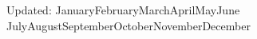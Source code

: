 \documentclass[11pt]{article}
\def\today{\number\day\space\ifcase\month\or%
  January\or February\or March\or April\or May\or June\or
  July\or August\or September\or October\or November\or December\fi
  \space\number\year}
\begin{document}






\vfill{}
\hrulefill

\begin{center}
\footnotesize  Updated: \today\\
\end{center}
\end{document}
